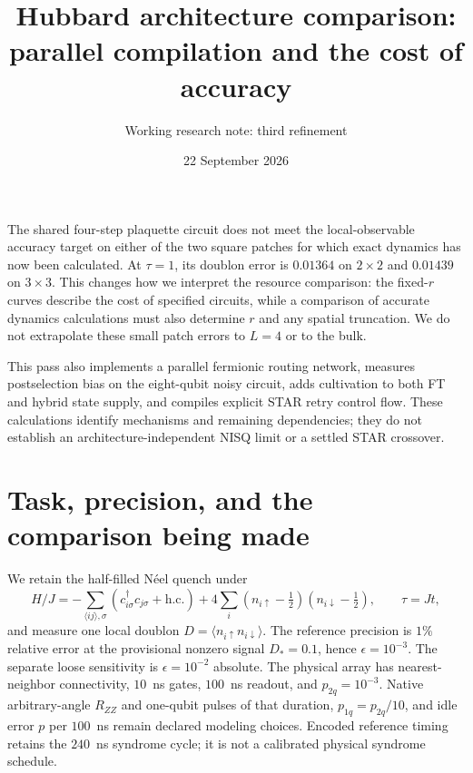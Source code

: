 \documentclass[11pt]{article}
\title{Hubbard architecture comparison:\\parallel compilation and the cost of accuracy}
\author{Working research note: third refinement}
\date{22 September 2026}
\newcommand{\eps}{\epsilon}
\begin{document}
\maketitle

The shared four-step plaquette circuit does not meet the local-observable
accuracy target on either of the two square patches for which exact dynamics
has now been calculated. At $\tau=1$, its doublon error is $0.01364$ on
$2\times2$ and $0.01439$ on $3\times3$. This changes how we interpret the
resource comparison: the fixed-$r$ curves describe the cost of specified
circuits, while a comparison of accurate dynamics calculations must also
determine $r$ and any spatial truncation. We do not extrapolate these small
patch errors to $L=4$ or to the bulk.

This pass also implements a parallel fermionic routing network, measures
postselection bias on the eight-qubit noisy circuit, adds cultivation to
both FT and hybrid state supply, and compiles explicit STAR retry control
flow. These calculations identify mechanisms and remaining dependencies;
they do not establish an architecture-independent NISQ limit or a settled
STAR crossover.

\section{Task, precision, and the comparison being made}
We retain the half-filled N\'eel quench under
\begin{equation}
 H/J=-\sum_{\langle ij\rangle,\sigma}
 (c^\dagger_{i\sigma}c_{j\sigma}+\mathrm{h.c.})
 +4\sum_i(n_{i\uparrow}-\tfrac12)(n_{i\downarrow}-\tfrac12),
 \qquad \tau=Jt,
\end{equation}
and measure one local doublon $D=\langle n_{i\uparrow}n_{i\downarrow}\rangle$.
The reference precision is $1\%$ relative error at the provisional nonzero
signal $D_*=0.1$, hence $\eps=10^{-3}$. The separate loose sensitivity is
$\eps=10^{-2}$ absolute. The physical array has nearest-neighbor connectivity,
$10$~ns gates, $100$~ns readout, and $p_{2q}=10^{-3}$. Native arbitrary-angle
$R_{ZZ}$ and one-qubit pulses of that duration, $p_{1q}=p_{2q}/10$, and idle
error $p$ per $100$~ns remain declared modeling choices. Encoded reference
timing retains the $240$~ns syndrome cycle; it is not a calibrated physical
syndrome schedule.
\end{document}

